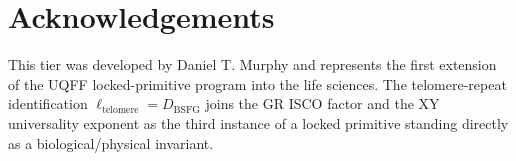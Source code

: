 \documentclass[11pt]{article}
\newcommand{\Dbsfg}{D_{\mathrm{BSFG}}}
\begin{document}
\section*{Acknowledgements}
This tier was developed by Daniel T. Murphy and represents the first
extension of the UQFF locked-primitive program into the life
sciences.  The telomere-repeat identification $\ell_{\text{telomere}}=\Dbsfg$ joins the GR ISCO factor and the XY universality
exponent as the third instance of a locked primitive standing
directly as a biological/physical invariant.
\end{document}
